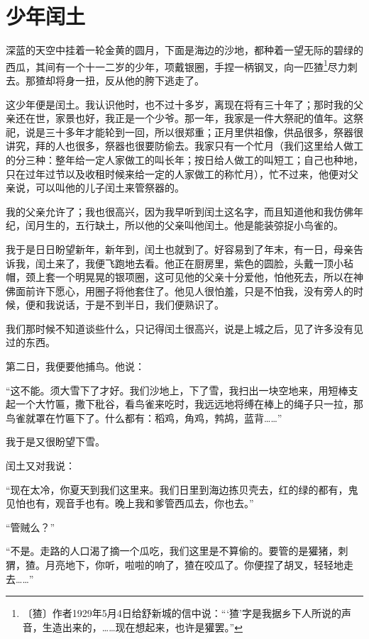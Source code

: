 \documentclass[12pt,UTF-8,openany]{ctexbook}
\begin{document}
\chapter{少年闰土}

\begin{large}
    
    深蓝的天空中挂着一轮金黄的圆月，下面是海边的沙地，都种着一望无际的碧绿的西瓜，其间有一个十一二岁的少年，项戴银圈，手捏一柄钢叉，向一匹猹\footnote{〔猹〕作者1929年5月4日给舒新城的信中说：“‘猹’字是我据乡下人所说的声音，生造出来的，……现在想起来，也许是獾罢。”}尽力刺去。那猹却将身一扭，反从他的胯下逃走了。
    
    这少年便是闰土。我认识他时，也不过十多岁，离现在将有三十年了；那时我的父亲还在世，家景也好，我正是一个少爷。那一年，我家是一件大祭祀的值年。这祭祀，说是三十多年才能轮到一回，所以很郑重；正月里供祖像，供品很多，祭器很讲究，拜的人也很多，祭器也很要防偷去。我家只有一个忙月（我们这里给人做工的分三种：整年给一定人家做工的叫长年；按日给人做工的叫短工；自己也种地，只在过年过节以及收租时候来给一定的人家做工的称忙月），忙不过来，他便对父亲说，可以叫他的儿子闰土来管祭器的。
    
    我的父亲允许了；我也很高兴，因为我早听到闰土这名字，而且知道他和我仿佛年纪，闰月生的，五行缺土，所以他的父亲叫他闰土。他是能装弶捉小鸟雀的。
    
    我于是日日盼望新年，新年到，闰土也就到了。好容易到了年末，有一日，母亲告诉我，闰土来了，我便飞跑地去看。他正在厨房里，紫色的圆脸，头戴一顶小毡帽，颈上套一个明晃晃的银项圈，这可见他的父亲十分爱他，怕他死去，所以在神佛面前许下愿心，用圈子将他套住了。他见人很怕羞，只是不怕我，没有旁人的时候，便和我说话，于是不到半日，我们便熟识了。
    
    我们那时候不知道谈些什么，只记得闰土很高兴，说是上城之后，见了许多没有见过的东西。
    
    第二日，我便要他捕鸟。他说：
    
    “这不能。须大雪下了才好。我们沙地上，下了雪，我扫出一块空地来，用短棒支起一个大竹匾，撒下秕谷，看鸟雀来吃时，我远远地将缚在棒上的绳子只一拉，那鸟雀就罩在竹匾下了。什么都有：稻鸡，角鸡，鹁鸪，蓝背……”
    
    我于是又很盼望下雪。
    
    闰土又对我说：
    
    “现在太冷，你夏天到我们这里来。我们日里到海边拣贝壳去，红的绿的都有，鬼见怕也有，观音手也有。晚上我和爹管西瓜去，你也去。”
    
    “管贼么？”
    
    “不是。走路的人口渴了摘一个瓜吃，我们这里是不算偷的。要管的是獾猪，刺猬，猹。月亮地下，你听，啦啦的响了，猹在咬瓜了。你便捏了胡叉，轻轻地走去……”
    

\end{large}
\end{document}
